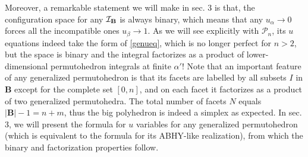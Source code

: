 \documentclass[hidelinks,12pt]{article}
\begin{document}
Moreover, a remarkable statement we will make in sec. 3 is that, the configuration space for any ${\cal I}_{\mathbf B}$ is always binary, which means that any $u_\alpha \to 0$ forces all the incompatible ones $u_\beta\to 1$. As we will see explicitly with ${\mathscr P}_n$, its $u$ equations indeed take the form of \eqref{genueq}, which is no longer perfect for $n>2$, but the space is binary and the integral factorizes as a product of lower-dimensional permutohedron integrals at finite $\alpha'$! Note that an important feature of any generalized permutohedron is that its facets are labelled by all subsets $I$ in ${\mathbf B}$ except for the complete set $[0,n]$, and on each facet it factorizes as a product of two generalized permutohedra. The total number of facets $N$ equals $|{\mathbf B}|-1=n+m$, thus the big polyhedron is indeed a simplex as expected. In sec. 3, we will present the formula for $u$ variables for any generalized permutohedron (which is equivalent to the formula for its ABHY-like realization), from which the binary and factorization properties follow.



\end{document}
